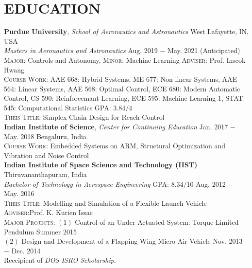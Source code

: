 \documentclass[letterpaper,11pt]{article}
\begin{document}
\section{EDUCATION}
\noindent \textbf{Purdue University}, \textit{School of Aeronautics and Astronautics} \hfill West Lafayette, IN, USA \\
\textit{Masters in Aeronautics and Astronautics} \hfill Aug. 2019 $-$ May. 2021 (Anticipated)\\
\textsc{Major}: Controls and Autonomy, \textsc{Minor}: Machine Learning \hfill \textsc{Adviser}: Prof. Inseok Hwang\\
\textsc{Course Work}: AAE 668: Hybrid Systems, ME 677: Non-linear Systems, AAE 564: Linear Systems,  AAE 568: Optimal Control, ECE 680: Modern Automatic Control, CS 590: Reinforcemant Learning, ECE 595: Machine Learning 1, STAT 545: Computational Statistics
\hfill \textsc{GPA}: $3.84/4$\\
\textsc{Theis Title}: Simplex Chain Design for Reach Control \\

\vspace{5pt}
\noindent \textbf{Indian Institute of Science}, \textit{Center for Continuing Education} \hfill Jan. 2017 $-$ May. 2018  \hfill Bengaluru, India \\
\textsc{Course Work:} Embedded Systems on ARM, Structural Optimization and Vibration and Noise Control \\

\vspace{5pt}
\noindent \textbf{Indian Institute of Space Science and Technology (IIST)} \hfill Thiruvananthapuram, India\\
\textit{Bachelor of Technology in Aerospace Engineering} \hfill \textsc{GPA}: $8.34/10$ \hfill Aug. 2012 $-$ May. 2016 \\
\textsc{Theis Title}: Modelling and Simulation of a Flexible Launch Vehicle
\hfill \textsc{Adviser}:Prof. K. Kurien Issac \\
\textsc{Major Projects}: $(1)$ Control of an Under-Actuated System: Torque Limited Pendulum \hfill {Summer 2015}\\
$(2)$ Design and Development of a Flapping Wing Micro Air Vehicle \hfill {Nov. 2013 $-$ Dec. 2014}\\
Receipient of \textit{DOS-ISRO Scholarship}.
\end{document}
